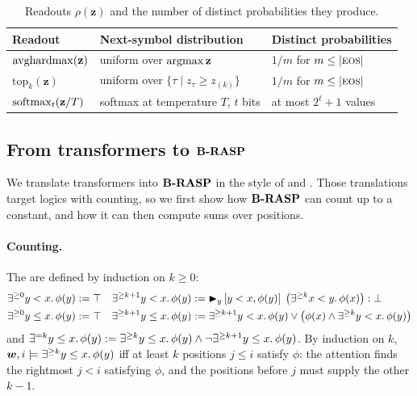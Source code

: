 \begin{table}[h]
\caption{Readouts $\rho(\mathbf{z})$ and the number of distinct probabilities they produce.}
\label{tab:readouts}
\begin{tabular}{lll}
\toprule
Readout & Next-symbol distribution & Distinct probabilities \\
\midrule
$\mathrm{avghardmax}(\mathbf{z})$ & uniform over $\operatorname*{{{ argmax}}}\mathbf{z}$ & $1/m$ for $m\leq|{{\textsc{eos}}}|$ \\
$\mathrm{top}_k(\mathbf{z})$ & uniform over $\{\tau\mid z_\tau\geq z_{(k)}\}$ & $1/m$ for $m\leq|{{\textsc{eos}}}|$ \\
${{ \mathrm{softmax}}}_t(\mathbf{z}/T)$ & softmax at temperature $T$, $t$ bits & at most $2^t+1$ values \\
\bottomrule
\end{tabular}
\end{table}

\subsection{From transformers to \texorpdfstring{${\textbf{B-RASP}}$}{B-RASP}}
\label{sec:transformer_to_brasp}

We translate transformers into ${\textbf{B-RASP}}$ in the style of
\citet[App.~B]{yang-etal-2025-knee} and \citet[App.~B.3]{yang-etal-2025-length}.
Those translations target logics with counting, so we first show how ${\textbf{B-RASP}}$ can count
up to a constant, and how it can then compute sums over positions.

\paragraph{Counting.}
The  are defined by induction on $k\geq 0$:
\begin{align*}
\exists^{\geq 0} y< x.\, \phi(y) &:= \top &
\exists^{\geq k+1} y< x.\, \phi(y) &:= {{{{\blacktriangleright}}_{y} \left[y<x, \phi(y)\right] \; \bigl(\exists^{\geq k} x<y.\,\phi(x)\bigr) : \bot}} \\
\exists^{\geq 0} y\leq x.\, \phi(y) &:= \top &
\exists^{\geq k+1} y\leq x.\, \phi(y) &:= \exists^{\geq k+1} y< x.\, \phi(y) \lor \bigl(\phi(x)\land\exists^{\geq k} y< x.\, \phi(y)\bigr)
\end{align*}
and $\exists^{= k} y\leq x.\, \phi(y) := \exists^{\geq k} y\leq x.\, \phi(y)\land\lnot\exists^{\geq k+1} y\leq x.\, \phi(y)$.
By induction on $k$, ${{\boldsymbol{w}}},i\models\exists^{\geq k} y\leq x.\, \phi(y)$ iff at least $k$ positions $j\leq i$ satisfy $\phi$:
the attention finds the rightmost $j<i$ satisfying $\phi$, and the positions before $j$ must supply the other $k-1$.

